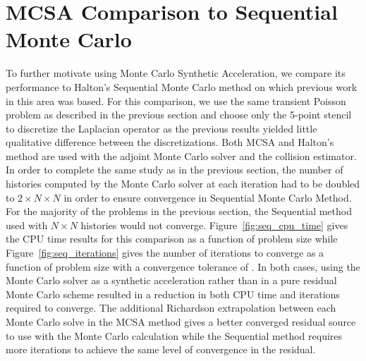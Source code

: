 \clearpage

\section{MCSA Comparison to Sequential Monte Carlo}
\label{subsec:sequential_comparison}
To further motivate using Monte Carlo Synthetic Acceleration, we
compare its performance to Halton's Sequential Monte Carlo method on
which previous work in this area was based. For this comparison, we
use the same transient Poisson problem as described in the previous
section and choose only the 5-point stencil to discretize the
Laplacian operator as the previous results yielded little qualitative
difference between the discretizations. Both MCSA and Halton's method
are used with the adjoint Monte Carlo solver and the collision
estimator. In order to complete the same study as in the previous
section, the number of histories computed by the Monte Carlo solver at
each iteration had to be doubled to $2 \times N \times N$ in order to
ensure convergence in Sequential Monte Carlo Method. For the majority
of the problems in the previous section, the Sequential method used
with $N \times N$ histories would not
converge. Figure~\ref{fig:seq_cpu_time} gives the CPU time results for
this comparison as a function of problem size while
Figure~\ref{fig:seq_iterations} gives the number of iterations to
converge as a function of problem size with a convergence tolerance of
. In both cases, using the Monte Carlo solver as a synthetic
acceleration rather than in a pure residual Monte Carlo scheme
resulted in a reduction in both CPU time and iterations required to
converge. The additional Richardson extrapolation between each Monte
Carlo solve in the MCSA method gives a better converged residual
source to use with the Monte Carlo calculation while the Sequential
method requires more iterations to achieve the same level of
convergence in the residual.


